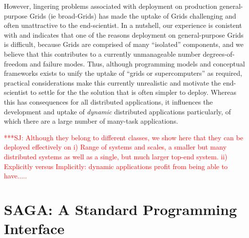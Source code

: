 \documentclass[conference,final]{IEEEtran}
\newcommand{\up}{\vspace*{-1em}}
\newcommand{\jhanote}[1]{ {\textcolor{red} { ***SJ: #1 }}}
\newcommand{\jhanote}[1]{}
\begin{document}




However, lingering problems associated with deployment on production
general-purpose Grids (ie broad-Grids) has made the uptake of Grids
challenging and often unattractive to the end-scientist. In a
nutshell, our experience is conistent with and indicates that one of
the reasons deployment on general-purpose Grids is difficult, because
Grids are comprised of many ``isolated'' components, and we believe
that this contributes to a currently unmanageable number
degrees-of-freedom and failure modes.  Thus, although programming
models and conceptual frameworks exists to unify the uptake of ``grids
or supercomputers'' as required, practical considerations make this
currently unrealistic and motivate the end-scientist to settle for the
the solution that is often simpler to deploy. Whereas this has
consequences for all distributed applications, it influences the
development and uptake of {\it dynamic} distributed applications
particularly, of which there are a large number of many-task
applications.


\jhanote{Although they belong to different classes, we show here that
  they can be deployed effectively on i) Range of systems and scales,
  a smaller but many distributed systems as well as a single, but much
  larger top-end system. ii) Explicitly versus Implicitly: dynamic
  applications profit from being able to have.....}

\up

\section{SAGA: A Standard Programming Interface}
\end{document}
